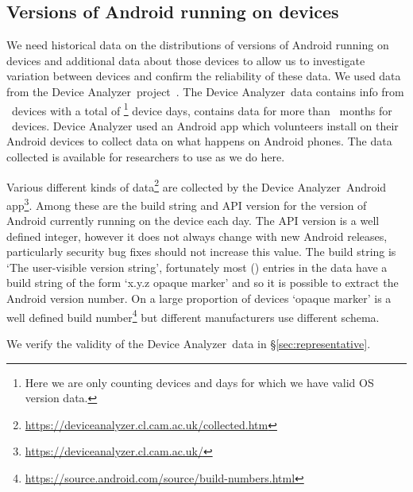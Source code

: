 \documentclass[conference,a4paper,twoside]{IEEEtran}
\newcommand{\da}{Device Analyzer}
\newcommand{\daNumDevices}{\daNumOSDevices}
\newcommand{\daDeviceDays}{\daOSTotalDaysData}
\begin{document}
\subsection{Versions of Android running on devices}
We need historical data on the distributions of versions of Android running on devices and additional data about those devices to allow us to investigate variation between devices and confirm the reliability of these data.
We used data from the \da\ project~\cite{Wagner2013}.
The \da\ data contains info from \daNumDevices\ devices with a total of \daDeviceDays\footnote{Here we are only counting devices and days for which we have valid OS version data.} device days, contains data for more than \daMonths\ months for \daMonthsDevices\ devices.
Device Analyzer used an Android app which volunteers install on their Android devices to collect data on what happens on Android phones.
The data collected is available for researchers to use as we do here.

Various different kinds of data\footnote{\url{https://deviceanalyzer.cl.cam.ac.uk/collected.htm}} are collected by the \da\ Android app\footnote{\url{https://deviceanalyzer.cl.cam.ac.uk/}}.
Among these are the build string and API version for the version of Android currently running on the device each day.
The API version is a well defined integer, however it does not always change with new Android releases, particularly security bug fixes should not increase this value.
The build string is `The user-visible version string', fortunately most (\daOSVersionPercValidLines) entries in the data have a build string of the form `x.y.z opaque marker' and so it is possible to extract the Android version number.
On a large proportion of devices `opaque marker' is a well defined build number\footnote{\url{https://source.android.com/source/build-numbers.html}} but different manufacturers use different schema.

We verify the validity of the \da\ data in \S\ref{sec:representative}.
\end{document}
